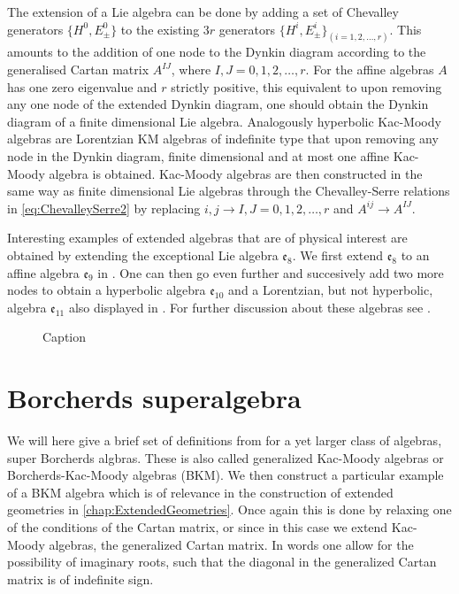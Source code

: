 The extension of a Lie algebra can be done by adding a set of Chevalley generators $\{H^0,E_{\pm}^0\}$ to the existing $3r$ generators $\{H^i,E_\pm^i\}_{(i=1,2,\ldots,r)}$. This amounts to the addition of one node to the Dynkin diagram according to the generalised Cartan matrix $A^{IJ}$, where $I,J=0,1,2,\ldots, r$. For the affine algebras $A$ has one zero eigenvalue and $r$ strictly positive, this equivalent to upon removing any one node of the extended Dynkin diagram, one should obtain the Dynkin diagram of a finite dimensional Lie algebra. Analogously hyperbolic Kac-Moody algebras are Lorentzian KM algebras of indefinite type that upon removing any node in the Dynkin diagram, finite dimensional and at most one affine Kac-Moody algebra is obtained. Kac-Moody algebras are then constructed in the same way as finite dimensional Lie algebras through the Chevalley-Serre relations in \eqref{eq:ChevalleySerre2} by replacing $i,j\to I,J=0,1,2,\ldots,r$ and $A^{ij}\to A^{IJ}$.

Interesting examples of extended algebras that are of physical interest are obtained by extending the exceptional Lie algebra $\mathfrak{e}_8$. We first extend $\mathfrak{e}_8$ to an affine algebra $\mathfrak{e}_9$ in . One can then go even further and succesively add two more nodes to obtain a hyperbolic algebra $\mathfrak{e}_{10}$ and a Lorentzian, but not hyperbolic, algebra $\mathfrak{e}_{11}$ also displayed in . For further discussion about these algebras see \cite{PhdJakob2009,PhdDaniel2010}.
\begin{figure}
    \caption{Caption}
    \label{fig:DynkinEseries}
\end{figure}


\section{Borcherds superalgebra}\label{sec:Borcherds}

We will here give a brief set of definitions from \cite{Ray2006} for a yet larger class of algebras, super Borcherds algbras. These is also called generalized Kac-Moody algebras or Borcherds-Kac-Moody algebras (BKM). We then construct a particular example of a BKM algebra which is of relevance in the construction of extended geometries in \ref{chap:ExtendedGeometries}. Once again this is done by relaxing one of the conditions of the Cartan matrix, or since in this case we extend Kac-Moody algebras, the generalized Cartan matrix. In words one allow for the possibility of imaginary roots, such that the diagonal in the generalized Cartan matrix is of indefinite sign.

